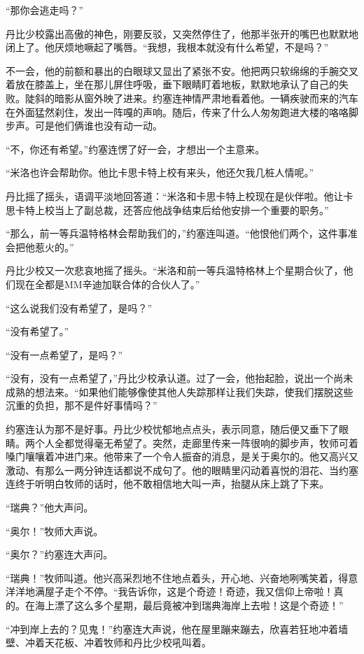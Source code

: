    “那你会逃走吗？”

    丹比少校露出高傲的神色，刚要反驳，又突然停住了，他那半张开的嘴巴也默默地闭上了。他厌烦地噘起了嘴唇。“我想，我根本就没有什么希望，不是吗？”

    不一会，他的前额和暴出的白眼球又显出了紧张不安。他把两只软绵绵的手腕交叉着放在膝盖上，坐在那儿屏住呼吸，垂下眼睛盯着地板，默默地承认了自己的失败。陡斜的暗影从窗外映了进来。约塞连神情严肃地看着他。一辆疾驶而来的汽车在外面猛然刹住，发出一阵嘎的声响。随后，传来了什么人匆匆跑进大楼的咯咯脚步声。可是他们俩谁也没有动一动。

    “不，你还有希望。”约塞连愣了好一会，才想出一个主意来。

    “米洛也许会帮助你。他比卡思卡特上校有来头，他还欠我几桩人情呢。”

    丹比摇了摇头，语调平淡地回答道：“米洛和卡思卡特上校现在是伙伴啦。他让卡思卡特上校当上了副总裁，还答应他战争结束后给他安排一个重要的职务。”

    “那么，前一等兵温特格林会帮助我们的，”约塞连叫道。“他恨他们两个，这件事准会把他惹火的。”

    丹比少校又一次悲哀地摇了摇头。“米洛和前一等兵温特格林上个星期合伙了，他们现在全都是MM辛迪加联合体的合伙人了。”

    “这么说我们没有希望了，是吗？”

    “没有希望了。”

    “没有一点希望了，是吗？”

    “没有，没有一点希望了，”丹比少校承认道。过了一会，他抬起脸，说出一个尚未成熟的想法来。“如果他们能够像使其他人失踪那样让我们失踪，使我们摆脱这些沉重的负担，那不是件好事情吗？”

    约塞连认为那不是好事。丹比少校忧郁地点点头，表示同意，随后便又垂下了眼睛。两个人全都觉得毫无希望了。突然，走廊里传来一阵很响的脚步声，牧师可着嗓门嚷嚷着冲进门来。他带来了一个令人振奋的消息，是关于奥尔的。他又高兴又激动、有那么一两分钟连话都说不成句了。他的眼睛里闪动着喜悦的泪花、当约塞连终于听明白牧师的话时，他不敢相信地大叫一声，抬腿从床上跳了下来。

    “瑞典？”他大声问。

    “奥尔！”牧师大声说。

    “奥尔？”约塞连大声问。

    “瑞典！”牧师叫道。他兴高采烈地不住地点着头，开心地、兴奋地咧嘴笑着，得意洋洋地满屋子走个不停。“我告诉你，这是个奇迹！奇迹，我又信仰上帝啦！真的。在海上漂了这么多个星期，最后竟被冲到瑞典海岸上去啦！这是个奇迹！”

    “冲到岸上去的？见鬼！”约塞连大声说，他在屋里蹦来蹦去，欣喜若狂地冲着墙壁、冲着天花板、冲着牧师和丹比少校吼叫着。

